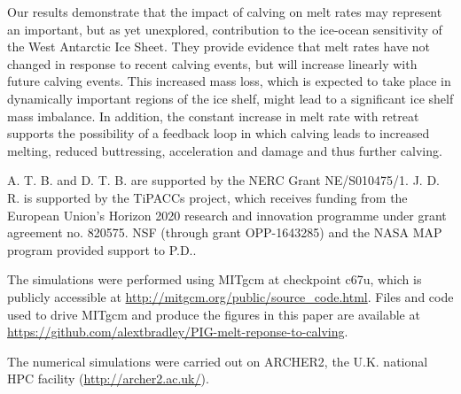 \documentclass[draft]{agujournal2019}
\begin{document}
Our results demonstrate that the impact of calving on melt rates may represent an important, but as yet unexplored, contribution to the ice-ocean sensitivity of the West Antarctic Ice Sheet. They provide evidence that melt rates have not changed in response to recent calving events, but will increase linearly with future calving events. This increased mass loss, which is expected to take place in dynamically important regions of the ice shelf, might lead to a significant ice shelf mass imbalance. In addition, the constant increase in melt rate with retreat supports the possibility of a feedback loop in which calving leads to increased melting, reduced buttressing, acceleration and damage and thus further calving.

\acknowledgments
A. T. B. and D. T. B. are supported by the NERC Grant NE/S010475/1. J. D. R. is supported by the TiPACCs project, which receives funding from the European Union's Horizon 2020 research and innovation programme under grant agreement no. 820575. NSF (through grant OPP-1643285) and the NASA MAP program provided support to P.D..

The simulations were performed using MITgcm at checkpoint c67u, which is publicly accessible at \url{http://mitgcm.org/public/source_code.html}. Files and code used to drive MITgcm and produce the figures in this paper are available at \url{https://github.com/alextbradley/PIG-melt-reponse-to-calving}.

The numerical simulations were carried out on ARCHER2, the U.K. national HPC facility (\url{http://archer2.ac.uk/}).


\end{document}
